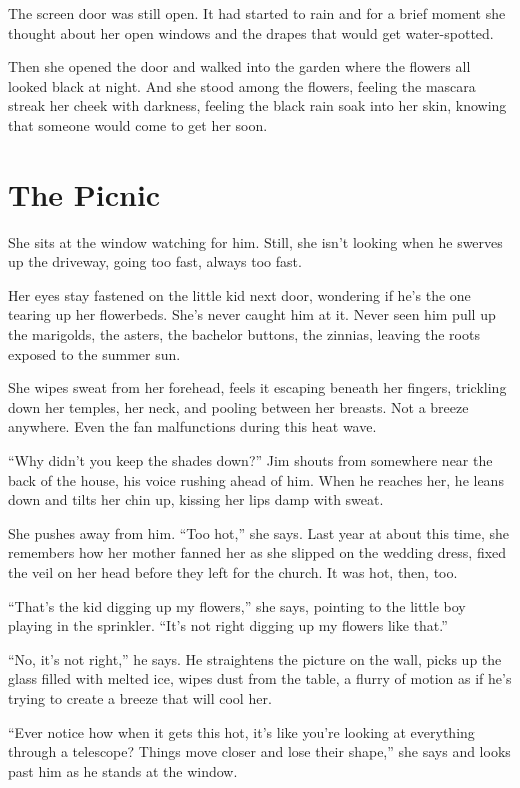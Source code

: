 \documentclass[twoside,10pt]{book}
\begin{document}
The screen door was still open. It had started to rain and for a brief
moment she thought about her open windows and the drapes that would get
water-spotted.

Then she opened the door and walked into the garden where the flowers
all looked black at night. And she stood among the flowers, feeling the
mascara streak her cheek with darkness, feeling the black rain soak into
her skin, knowing that someone would come to get her soon.



\cleardoublepage
\chapter{The Picnic}

She sits at the window watching for him. Still, she isn't looking when
he swerves up the drive­way, going too fast, always too fast.

Her eyes stay fastened on the little kid next door, wondering if he's
the one tearing up her flowerbeds. She's never caught him at it. Never
seen him pull up the marigolds, the asters, the bache­lor buttons, the
zinnias, leaving the roots exposed to the summer sun.

She wipes sweat from her forehead, feels it escaping beneath her
fingers, trickling down her temples, her neck, and pooling between her
breasts. Not a breeze anywhere. Even the fan malfunc­tions during this
heat wave.

``Why didn't you keep the shades down?'' Jim shouts from somewhere near
the back of the house, his voice rushing ahead of him. When he reaches
her, he leans down and tilts her chin up, kiss­ing her lips damp with
sweat.

She pushes away from him. ``Too hot,'' she says. Last year at about this
time, she remembers how her mother fanned her as she slipped on the
wedding dress, fixed the veil on her head before they left for the
church. It was hot, then, too.

``That's the kid digging up my flowers,'' she says, pointing to the
little boy playing in the sprin­kler. ``It's not right digging up my
flowers like that.''

``No, it's not right,'' he says. He straightens the picture on the wall,
picks up the glass filled with melted ice, wipes dust from the table,
\clearpage
a
flurry of motion as if he's trying to create a breeze that will cool
her.

``Ever notice how when it gets this hot, it's like you're looking at
everything through a telescope? Things move closer and lose their
shape,'' she says and looks past him as he stands at the window.
\end{document}
